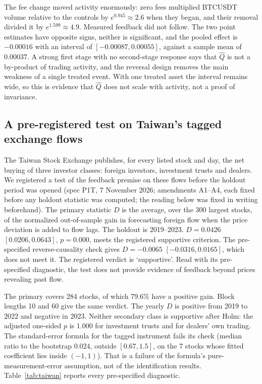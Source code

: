 \documentclass[12pt]{article}
\theoremstyle{definition}
\theoremstyle{remark}
\begin{document}
The fee change moved activity enormously: zero fees multiplied BTCUSDT volume relative to the controls by $e^{0.945}\approx2.6$ when they began, and their removal divided it by $e^{1.599}\approx4.9$. Measured feedback did not follow. The two point estimates have opposite signs, neither is significant, and the pooled effect is $-0.00016$ with an interval of $[-0.00087,0.00055]$, against a sample mean of $0.00037$. A strong first stage with no second-stage response says that $\hat Q$ is not a by-product of trading activity, and the reversal design removes the main weakness of a single treated event. With one treated asset the interval remains wide, so this is evidence that $\hat Q$ does not scale with activity, not a proof of invariance.

\subsection{A pre-registered test on Taiwan's tagged exchange flows}\label{sec:taiwan}
The Taiwan Stock Exchange publishes, for every listed stock and day, the net buying of three investor classes: foreign investors, investment trusts and dealers. We registered a test of the feedback premise on these flows before the holdout period was opened (spec P1T, 7 November 2026; amendments A1--A4, each fixed before any holdout statistic was computed; the reading below was fixed in writing beforehand). The primary statistic $D$ is the average, over the 300 largest stocks, of the normalized out-of-sample gain in forecasting foreign flow when the price deviation is added to flow lags. The holdout is 2019--2023. $D=0.0426$ $[0.0206, 0.0643]$, $p=0.000$, meets the registered supportive criterion. The pre-specified reverse-causality check gives $D=-0.0065$ $[-0.0316, 0.0165]$, which does not meet it. The registered verdict is `supportive'. Read with its pre-specified diagnostic, the test does not provide evidence of feedback beyond prices revealing past flow.

The primary covers 284 stocks, of which 79.6\% have a positive gain. Block lengths 10 and 60 give the same verdict. The yearly $D$ is positive from 2019 to 2022 and negative in 2023. Neither secondary class is supportive after Holm: the adjusted one-sided $p$ is $1.000$ for investment trusts and for dealers' own trading. The standard-error formula for the tagged instrument fails its check (median ratio to the bootstrap $0.024$, outside $[0.67,1.5]$, on the 7 stocks whose fitted coefficient lies inside $(-1,1)$). That is a failure of the formula's pure-measurement-error assumption, not of the identification results. Table~\ref{tab:taiwan} reports every pre-specified diagnostic.
\end{document}
